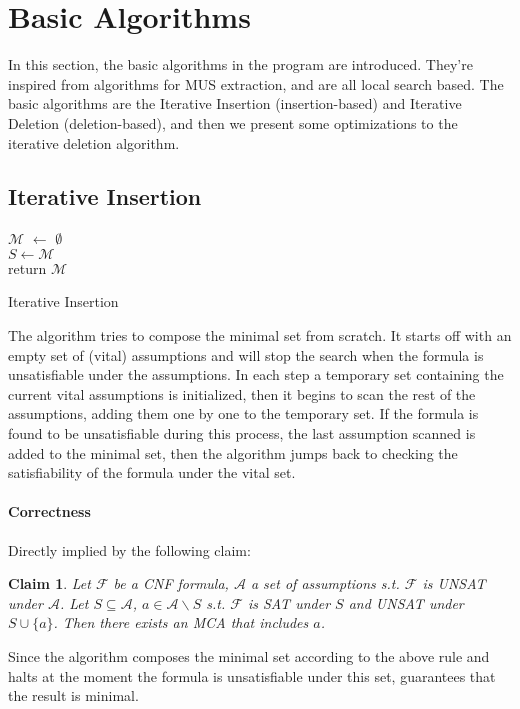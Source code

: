 \documentclass[]{article}
\newtheorem{claim}  {Claim}
\begin{document}
	
	\pagebreak
	\section{Basic Algorithms}
	In this section, the basic algorithms in the program are introduced. They're inspired from algorithms for MUS extraction\cite{PracticalAlgs}, and are all local search based. The basic algorithms are the Iterative Insertion (insertion-based) and Iterative Deletion (deletion-based), and then we present some optimizations to the iterative deletion algorithm.
	\subsection{Iterative Insertion}
		\begin{algorithm}[H]
		$ \mathcal{M} $ $\leftarrow$ $\emptyset$\\
		 {
			$  S  \leftarrow  \mathcal{M} $\\
		}
		return $ \mathcal{M} $
		\caption{Iterative Insertion}
	\end{algorithm}
	The algorithm tries to compose the minimal set from scratch. It starts off with an empty set of (vital) assumptions and will stop the search when the formula is unsatisfiable under the  assumptions. In each step a temporary set containing the current vital assumptions is initialized, then it begins to scan the rest of the assumptions, adding them one by one to the temporary set. If the formula is found to be unsatisfiable during this process, the last assumption scanned is added to the minimal set, then the algorithm jumps back to checking the satisfiability of the formula under the vital set.
	
	\paragraph{Correctness} Directly implied by the following claim:
	\begin{claim}
		Let $ \mathcal{F} $ be a CNF formula, $ \mathcal{A} $ a set of assumptions s.t. $ \mathcal{F} $ is UNSAT under $ \mathcal{A} $. Let $ S \subseteq \mathcal{A} $, $ a \in \mathcal{A} \backslash S $ s.t. $ \mathcal{F} $ is SAT under $ S $ and UNSAT under $ S \cup \{a\} $. Then there exists an MCA that includes $ a $.
	\end{claim}
	Since the algorithm composes the minimal set according to the above rule and halts at the moment the formula is unsatisfiable under this set, guarantees that the result is minimal.
\end{document}
